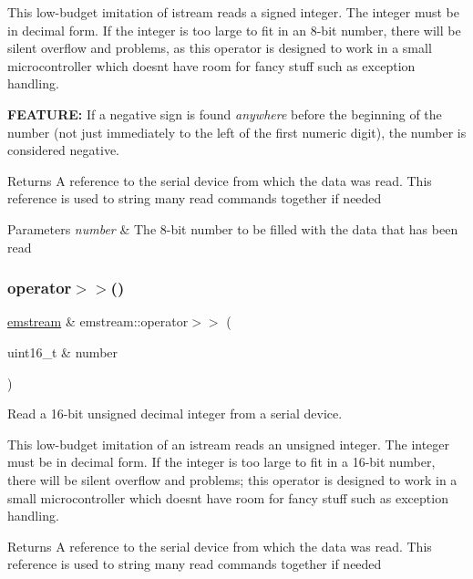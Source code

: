 This low-\/budget imitation of {\ttfamily istream} reads a signed integer. The integer must be in decimal form. If the integer is too large to fit in an 8-\/bit number, there will be silent overflow and problems, as this operator is designed to work in a small microcontroller which doesn\textquotesingle{}t have room for fancy stuff such as exception handling. \begin{DoxyItemize}
\item {\bfseries F\+E\+A\+T\+U\+RE\+:} If a negative sign is found {\itshape anywhere} before the beginning of the number (not just immediately to the left of the first numeric digit), the number is considered negative. \begin{DoxyReturn}{Returns}
A reference to the serial device from which the data was read. This reference is used to string many read commands together if needed 
\end{DoxyReturn}

\begin{DoxyParams}{Parameters}
{\em number} & The 8-\/bit number to be filled with the data that has been read \\
\hline
\end{DoxyParams}
\end{DoxyItemize}
\mbox{\label{classemstream_a5735ebb0098bafd1e653e1ca2b4885b1}} 
\subsubsection{\texorpdfstring{operator$>$$>$()}{operator>>()}\hspace{0.1cm}{\footnotesize\ttfamily [4/8]}}
{\footnotesize\ttfamily \mbox{\hyperlink{classemstream}{emstream}} \& emstream\+::operator$>$$>$ (\begin{DoxyParamCaption}\item[{uint16\+\_\+t \&}]{number }\end{DoxyParamCaption})}



Read a 16-\/bit unsigned decimal integer from a serial device. 

This low-\/budget imitation of an {\ttfamily istream} reads an unsigned integer. The integer must be in decimal form. If the integer is too large to fit in a 16-\/bit number, there will be silent overflow and problems; this operator is designed to work in a small microcontroller which doesn\textquotesingle{}t have room for fancy stuff such as exception handling. \begin{DoxyReturn}{Returns}
A reference to the serial device from which the data was read. This reference is used to string many read commands together if needed 
\end{DoxyReturn}

